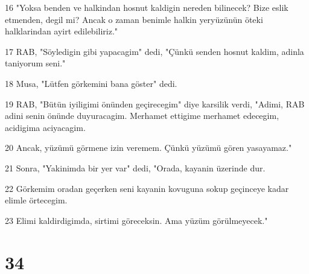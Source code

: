 \par 16 "Yoksa benden ve halkindan hosnut kaldigin nereden bilinecek? Bize eslik etmenden, degil mi? Ancak o zaman benimle halkin yeryüzünün öteki halklarindan ayirt edilebiliriz."
\par 17 RAB, "Söyledigin gibi yapacagim" dedi, "Çünkü senden hosnut kaldim, adinla taniyorum seni."
\par 18 Musa, "Lütfen görkemini bana göster" dedi.
\par 19 RAB, "Bütün iyiligimi önünden geçirecegim" diye karsilik verdi, "Adimi, RAB adini senin önünde duyuracagim. Merhamet ettigime merhamet edecegim, acidigima aciyacagim.
\par 20 Ancak, yüzümü görmene izin veremem. Çünkü yüzümü gören yasayamaz."
\par 21 Sonra, "Yakinimda bir yer var" dedi, "Orada, kayanin üzerinde dur.
\par 22 Görkemim oradan geçerken seni kayanin kovuguna sokup geçinceye kadar elimle örtecegim.
\par 23 Elimi kaldirdigimda, sirtimi göreceksin. Ama yüzüm görülmeyecek."

\chapter{34}

